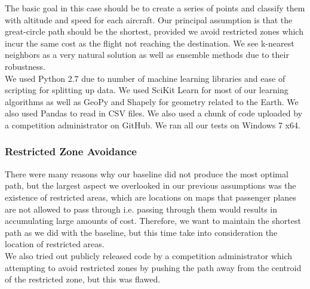 \documentclass{article}[12pt]
\begin{document}
\begin{multicols}{2}
The basic goal in this case should be to create a series of points and classify them with altitude and speed for each aircraft. Our principal assumption is that the great-circle path should be the shortest, provided we avoid restricted zones which incur the same cost as the flight not reaching the destination. We see k-nearest neighbors as a very natural solution as well as ensemble methods due to their robustness.\\

We used Python 2.7 due to number of machine learning libraries and ease of scripting for splitting up data. We used SciKit Learn for most of our learning algorithms as well as GeoPy and Shapely for geometry related to the Earth. We also used Pandas to read in CSV files. We also used a chunk of code uploaded by a competition administrator on GitHub. We ran all our tests on Windows 7 x64.

\subsubsection{Restricted Zone Avoidance}

There were many reasons why our baseline did not produce the most optimal path, but the largest aspect we overlooked in our previous assumptions was the existence of restricted areas, which are locations on maps that passenger planes are not allowed to pass through i.e. passing through them would results in accumulating large amounts of cost. Therefore, we want to maintain the shortest path as we did with the baseline, but this time take into consideration the location of restricted areas.\\

We also tried out publicly released code by a competition administrator which attempting to avoid restricted zones by pushing the path away from the centroid of the restricted zone, but this was flawed.


\end{multicols}
\end{document}
